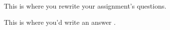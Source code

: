 \documentclass[11pt,twocolumn]{article}
\begin{document}
\begin{question}
  This is where you rewrite your assignment's questions.
\end{question}

\begin{answer}
  This is where you'd write an answer \cite{Knuth:1986}.
\end{answer}


\end{document}
